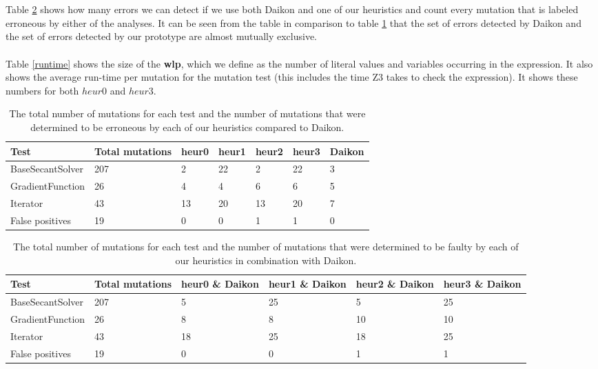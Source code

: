 \documentclass[a4paper, fleqn]{article}
\newcommand{\wlp}{\textbf{wlp}\xspace}
\begin{document}
\\
\\
Table \ref{results with daikon} shows how many errors we can detect if we use both Daikon and one of our heuristics and count every mutation that is labeled erroneous by either of the analyses. It can be seen from the table in comparison to table \ref{results per heuristic} that the set of errors detected by Daikon and the set of errors detected by our prototype are almost mutually exclusive.
\\
\\
Table \ref{runtime} shows the size of the \wlp, which we define as the number of literal values and variables occurring in the expression. It also shows the average run-time per mutation for the mutation test (this includes the time Z3 takes to check the expression). It shows these numbers for both $heur0$ and $heur3$.

\begin{table}
    \begin{tabular}{ | p{2.4cm} | p{2.3cm} | p{0.88cm} | p{.88cm} | p{.88cm}  | p{.88cm} | p{.88cm} |}
    \hline
    Test & Total mutations & heur0 & heur1 & heur2 & heur3 & Daikon \\ \hline
    BaseSecantSolver & 207 & 2 & 22 & 2 & 22 & 3 \\ \hline
    GradientFunction & 26 & 4 & 4 & 6 & 6 & 5 \\ \hline
    Iterator & 43 & 13 & 20 & 13 & 20 & 7 \\ \hline
    False positives & 19 & 0 & 0 & 1 & 1 & 0 \\ \hline
    \end{tabular}
\caption{The total number of mutations for each test and the number of mutations that were determined to be erroneous by each of our heuristics compared to Daikon.}
\label{results per heuristic}
\end{table}

\begin{table}
    \begin{tabular}{ | p{2.4cm} | p{2.3cm} | p{1.2cm} | p{1.2cm} | p{1.2cm}  | p{1.2cm}|}
    \hline
    Test & Total mutations & heur0 \& Daikon & heur1 \& Daikon & heur2 \& Daikon & heur3 \& Daikon \\ \hline
    BaseSecantSolver & 207 & 5 & 25 & 5 & 25 \\ \hline
    GradientFunction & 26 & 8 & 8 & 10 & 10 \\ \hline
    Iterator & 43 & 18 & 25 & 18 & 25 \\ \hline
    False positives & 19 & 0 & 0 & 1 & 1 \\ \hline
    \end{tabular}
\caption{The total number of mutations for each test and the number of mutations that were determined to be faulty by each of our heuristics in combination with Daikon.}
\label{results with daikon}
\end{table}
\end{document}
